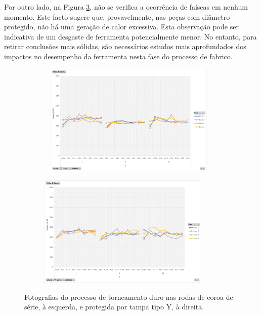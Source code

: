 \par
Por outro lado, na Figura \ref{fig:torn_duro_Y}, não se verifica a ocorrência de faíscas em nenhum momento. Este facto sugere que, provavelmente, nas peças com diâmetro protegido, não há uma geração de calor excessiva. Esta observação pode ser indicativa de um desgaste de ferramenta potencialmente menor. No entanto, para retirar conclusões mais sólidas, são necessários estudos mais aprofundados dos impactos no desempenho da ferramenta nesta fase do processo de fabrico.
\begin{figure}[htb]
    \centering
    \begin{subfigure}{.4\textwidth}\
        \centering
        \includegraphics[width = 0.9\textwidth]{Figures/Cap4/Grafico_4_Zonas_Y.png}
        \caption{}
        \label{fig:torn_duro_serie}
    \end{subfigure}%
    \begin{subfigure}{.4\textwidth}
        \centering
        \includegraphics[width = 0.9\textwidth]{Figures/Cap4/Grafico_4_Zonas_O.png}
        \caption{}
        \label{fig:torn_duro_Y}
    \end{subfigure}
    \caption[Fotografias do processo de torneamento duro nas rodas de coroa de série.]%
    {Fotografias do processo de torneamento duro nas rodas de coroa de série, à esquerda, e protegida por tampa tipo Y, à direita.}
\end{figure}

